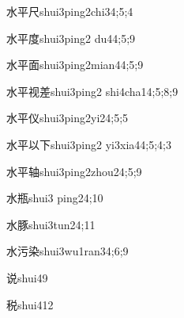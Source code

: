 \begin{verbete}{水平尺}{shui3ping2chi3}{4;5;4}
\end{verbete}

\begin{verbete}{水平度}{shui3ping2 du4}{4;5;9}
\end{verbete}

\begin{verbete}{水平面}{shui3ping2mian4}{4;5;9}
\end{verbete}

\begin{verbete}{水平视差}{shui3ping2 shi4cha1}{4;5;8;9}
\end{verbete}

\begin{verbete}{水平仪}{shui3ping2yi2}{4;5;5}
\end{verbete}

\begin{verbete}{水平以下}{shui3ping2 yi3xia4}{4;5;4;3}
\end{verbete}

\begin{verbete}{水平轴}{shui3ping2zhou2}{4;5;9}
\end{verbete}

\begin{verbete}{水瓶}{shui3 ping2}{4;10}
\end{verbete}

\begin{verbete}{水豚}{shui3tun2}{4;11}
\end{verbete}

\begin{verbete}{水污染}{shui3wu1ran3}{4;6;9}
\end{verbete}

\begin{verbete}{说}{shui4}{9}
\end{verbete}

\begin{verbete}{税}{shui4}{12}
\end{verbete}

